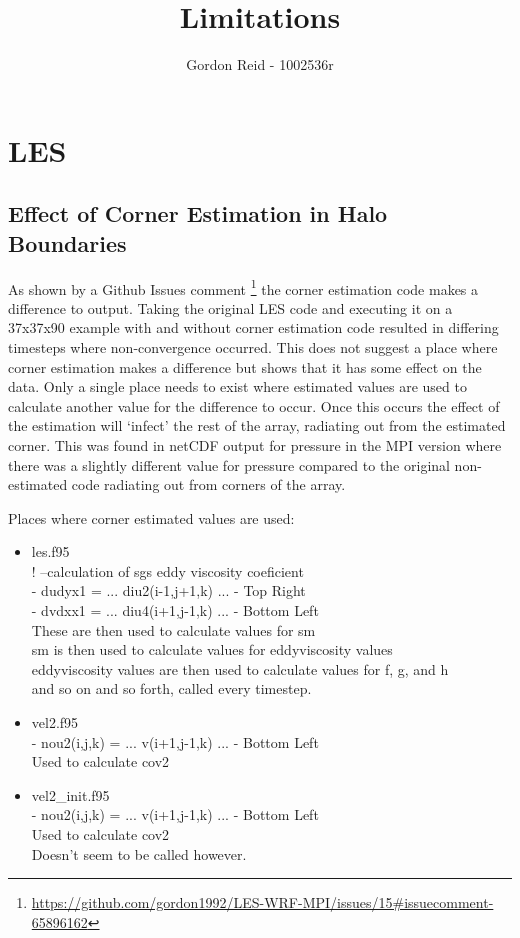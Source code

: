 \documentclass{article}
\title{Limitations}
\author{Gordon Reid - 1002536r}
\begin{document}
\maketitle

\section{LES}

\subsection{Effect of Corner Estimation in Halo Boundaries}

As shown by a Github Issues comment
\footnote{\url{https://github.com/gordon1992/LES-WRF-MPI/issues/15#issuecomment-65896162}}
the corner estimation code makes a difference to output. Taking the original LES
code and executing it on a 37x37x90 example with and without corner estimation
code resulted in differing timesteps where non-convergence occurred. This does
not suggest a place where corner estimation makes a difference but shows that it
has some effect on the data. Only a single place needs to exist where estimated
values are used to calculate another value for the difference to occur. Once
this occurs the effect of the estimation will `infect' the rest of the array,
radiating out from the estimated corner. This was found in netCDF output for
pressure in the MPI version where there was a slightly different value for
pressure compared to the original non-estimated code radiating out from corners
of the array.

Places where corner estimated values are used:

\begin{itemize}
    \item les.f95\\
    ! --calculation of sgs eddy viscosity coeficient\\
    - dudyx1 = ... diu2(i-1,j+1,k) ... - Top Right\\
    - dvdxx1 = ... diu4(i+1,j-1,k) ... - Bottom Left\\
    These are then used to calculate values for sm\\
    sm is then used to calculate values for eddyviscosity values\\
    eddyviscosity values are then used to calculate values for f, g, and h\\
    and so on and so forth, called every timestep.
    \item vel2.f95\\
    - nou2(i,j,k) = ... v(i+1,j-1,k) ... - Bottom Left \\
    Used to calculate cov2
    \item vel2\_init.f95\\
    - nou2(i,j,k) = ... v(i+1,j-1,k) ... - Bottom Left \\
    Used to calculate cov2\\
    Doesn't seem to be called however.
\end{itemize}
\end{document}
